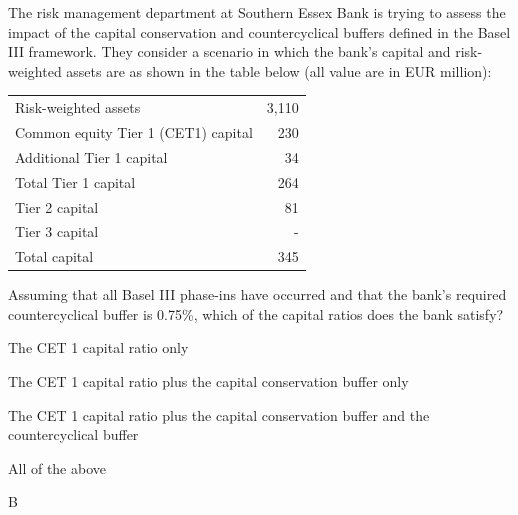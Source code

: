\documentclass{article}
\newcounter{question} %
\begin{document}
\begin{question}
    The risk management department at Southern Essex Bank is trying to assess the impact of the capital conservation and countercyclical buffers defined in the Basel III framework. They consider a scenario in which the bank's capital and risk-weighted assets are as shown in the table below (all value are in EUR million):

    \begin{table}[htbp]
        \centering
        \begin{tabular}{l r}
            \hline
            Risk-weighted assets                & 3,110 \\
            Common equity Tier 1 (CET1) capital & 230   \\
            Additional Tier 1 capital           & 34    \\
            Total Tier 1 capital                & 264   \\
            Tier 2 capital                      & 81    \\
            Tier 3 capital                      & -     \\
            Total capital                       & 345   \\
            \hline
        \end{tabular}
    \end{table}

    Assuming that all Basel III phase-ins have occurred and that the bank's required countercyclical buffer is 0.75\%, which of the capital ratios does the bank satisfy?
\end{question}

\begin{choices}
    \item The CET 1 capital ratio only
    \item The CET 1 capital ratio plus the capital conservation buffer only
    \item The CET 1 capital ratio plus the capital conservation buffer and the countercyclical buffer
    \item All of the above
\end{choices}

\begin{correctanswer}
    B
\end{correctanswer}
\end{document}
